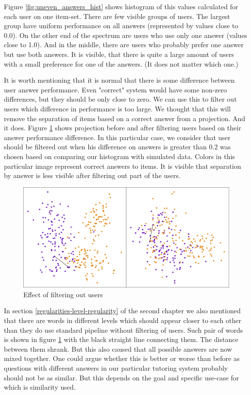 \documentclass[
  digital, %
  table,   %
  nolof,     %
  nolot,     %
  nocover,
  color,
  final, %
]{fithesis3}
\begin{document}
Figure \ref{fig:uneven_answers_hist} shows histogram of this values calculated for each user on one item-set. There are few visible groups of users. The largest group have uniform performance on all answers (represented by values close to 0.0). On the other end of the spectrum are users who use only one answer (values close to 1.0). And in the middle, there are users who probably prefer one answer but use both answers. It is visible, that there is quite a large amount of users with a small preference for one of the answers. (It does not matter which one.)


It is worth mentioning that it is normal that there is some difference between user answer performance. Even "correct" system would have some non-zero differences, but they should be only close to zero. We can use this to filter out users which difference in performance is too large. We thought that this will remove the separation of items based on a correct answer from a projection. And it does. Figure \ref{fig:answers_normalization} shows projection before and after filtering users based on their answer performance difference. In this particular case, we consider that user should be filtered out when his difference on answers is greater than 0.2 was chosen based on comparing our histogram with simulated data. Colors in this particular image represent correct answers to items. It is visible that separation by answer is less visible after filtering out part of the users.

\begin{figure}
  \includegraphics[width=\textwidth]{img/answers_normalization}
  \caption{Effect of filtering out users}
  \label{fig:answers_normalization}
\end{figure}

In section \ref{regularities-level-regularity} of the second chapter we also mentioned that there are words in different levels which should appear closer to each other than they do use standard pipeline without filtering of users. Such pair of words is shown in figure \ref{fig:answers_normalization} with the black straight line connecting them. The distance between them shrank. But this also caused that all possible answers are now mixed together. One could argue whether this is better or worse than before as questions with different answers in our particular tutoring system probably should not be as similar. But this depends on the goal and specific use-case for which is similarity used.
\end{document}
